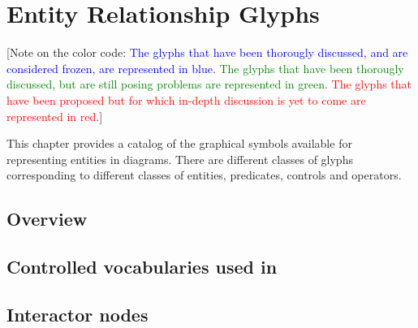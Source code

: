 
\chapter{Entity Relationship Glyphs}

[Note on the color code: \textcolor{blue}{The glyphs that have been thorougly discussed, and are considered frozen, are represented in blue}. \textcolor{green}{The glyphs that have been thorougly discussed, but are still posing problems are represented in green}. \textcolor{red}{The glyphs that have been proposed but for which in-depth discussion is yet to come are represented in red}.]

This chapter provides a catalog of the graphical symbols available for representing entities in \ER diagrams.  There are different classes of glyphs corresponding to different classes of entities, predicates, controls and operators.


\section{Overview}
 

 
\section{Controlled vocabularies used in \SBGNERLone}\label{sec:CVs}


 
 
 \section{Interactor nodes}\label{sec:ENs}

